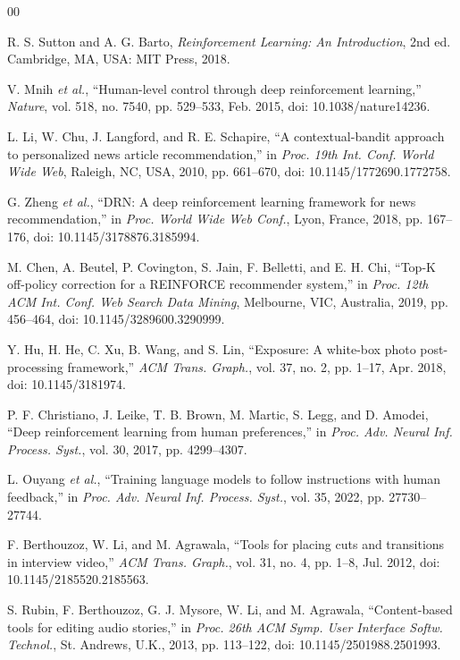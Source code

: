 \documentclass{ieeeaccess}
\begin{document}
\begin{thebibliography}{00}

 R. S. Sutton and A. G. Barto, \emph{Reinforcement Learning: An Introduction}, 2nd ed. Cambridge, MA, USA: MIT Press, 2018.

 V. Mnih \emph{et al.}, ``Human-level control through deep reinforcement learning,'' \emph{Nature}, vol. 518, no. 7540, pp. 529--533, Feb. 2015, doi: 10.1038/nature14236.

 L. Li, W. Chu, J. Langford, and R. E. Schapire, ``A contextual-bandit approach to personalized news article recommendation,'' in \emph{Proc. 19th Int. Conf. World Wide Web}, Raleigh, NC, USA, 2010, pp. 661--670, doi: 10.1145/1772690.1772758.

 G. Zheng \emph{et al.}, ``DRN: A deep reinforcement learning framework for news recommendation,'' in \emph{Proc. World Wide Web Conf.}, Lyon, France, 2018, pp. 167--176, doi: 10.1145/3178876.3185994.

 M. Chen, A. Beutel, P. Covington, S. Jain, F. Belletti, and E. H. Chi, ``Top-K off-policy correction for a REINFORCE recommender system,'' in \emph{Proc. 12th ACM Int. Conf. Web Search Data Mining}, Melbourne, VIC, Australia, 2019, pp. 456--464, doi: 10.1145/3289600.3290999.

 Y. Hu, H. He, C. Xu, B. Wang, and S. Lin, ``Exposure: A white-box photo post-processing framework,'' \emph{ACM Trans. Graph.}, vol. 37, no. 2, pp. 1--17, Apr. 2018, doi: 10.1145/3181974.

 P. F. Christiano, J. Leike, T. B. Brown, M. Martic, S. Legg, and D. Amodei, ``Deep reinforcement learning from human preferences,'' in \emph{Proc. Adv. Neural Inf. Process. Syst.}, vol. 30, 2017, pp. 4299--4307.

 L. Ouyang \emph{et al.}, ``Training language models to follow instructions with human feedback,'' in \emph{Proc. Adv. Neural Inf. Process. Syst.}, vol. 35, 2022, pp. 27730--27744.

 F. Berthouzoz, W. Li, and M. Agrawala, ``Tools for placing cuts and transitions in interview video,'' \emph{ACM Trans. Graph.}, vol. 31, no. 4, pp. 1--8, Jul. 2012, doi: 10.1145/2185520.2185563.

 S. Rubin, F. Berthouzoz, G. J. Mysore, W. Li, and M. Agrawala, ``Content-based tools for editing audio stories,'' in \emph{Proc. 26th ACM Symp. User Interface Softw. Technol.}, St. Andrews, U.K., 2013, pp. 113--122, doi: 10.1145/2501988.2501993.


\end{thebibliography}
\end{document}
